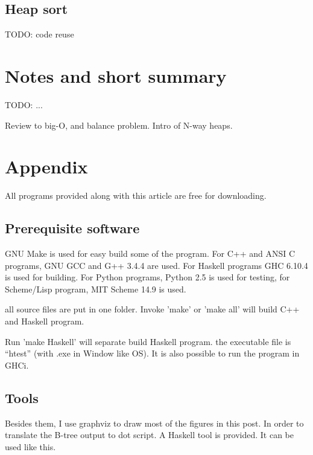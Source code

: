 \documentclass{article}
\begin{document}
\subsection{Heap sort}

TODO: code reuse

\section{Notes and short summary}

TODO: ...

Review to big-O, and balance problem.
Intro of N-way heaps.


\section{Appendix} \label{appendix}
All programs provided along with this article are free for
downloading.

\subsection{Prerequisite software}
GNU Make is used for easy build some of the program. For C++ and ANSI C programs,
GNU GCC and G++ 3.4.4 are used. 
For Haskell programs GHC 6.10.4 is used
for building. For Python programs, Python 2.5 is used for testing, for
Scheme/Lisp program, MIT Scheme 14.9 is used.

all source files are put in one folder. Invoke 'make' or 'make all'
will build C++ and Haskell program. 

Run 'make Haskell' will separate build Haskell program. the executable
file is ``htest'' (with .exe
in Window like OS). It is also possible to run the program in GHCi.

\subsection{Tools}

Besides them, I use graphviz to draw most of the figures in this post. In order to
translate the B-tree output to dot script. A Haskell tool is provided.
It can be used like this.
\end{document}
